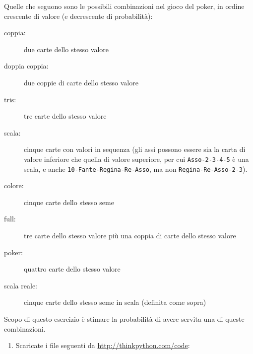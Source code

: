\documentclass[10pt]{book}
\begin{document}
\begin{exercise}
\label{poker}

Quelle che seguono sono le possibili combinazioni nel gioco del poker, in ordine crescente di valore (e decrescente di probabilità):

\begin{description}

\item[coppia:] due carte dello stesso valore
\vspace{-0.05in}

\item[doppia coppia:] due coppie di carte dello stesso valore
\vspace{-0.05in}

\item[tris:] tre carte dello stesso valore
\vspace{-0.05in}

\item[scala:] cinque carte con valori in sequenza (gli assi possono essere sia la carta di valore inferiore che quella di valore superiore, per cui {\tt Asso-2-3-4-5} è una scala, e anche {\tt 10-Fante-Regina-Re-Asso}, ma non {\tt Regina-Re-Asso-2-3}).
\vspace{-0.05in}

\item[colore:] cinque carte dello stesso seme
\vspace{-0.05in}

\item[full:] tre carte dello stesso valore più una coppia di carte dello stesso valore
\vspace{-0.05in}

\item[poker:] quattro carte dello stesso valore
\vspace{-0.05in}

\item[scala reale:] cinque carte dello stesso seme in scala (definita come sopra)
\vspace{-0.05in}

\end{description}
%
Scopo di questo esercizio è stimare la probabilità di avere servita una di queste combinazioni.

\begin{enumerate}

\item Scaricate i file seguenti da \url{http://thinkpython.com/code}:


\end{enumerate}
\end{exercise}
\end{document}
